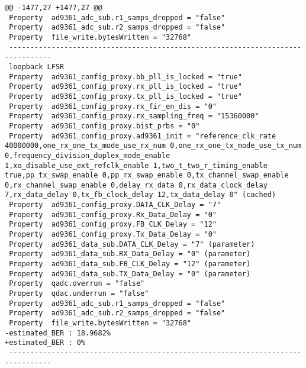\begin{lstlisting}
@@ -1477,27 +1477,27 @@
 Property  ad9361_adc_sub.r1_samps_dropped = "false"
 Property  ad9361_adc_sub.r2_samps_dropped = "false"
 Property  file_write.bytesWritten = "32768"
 --------------------------------------------------------------------------------
 loopback LFSR
 Property  ad9361_config_proxy.bb_pll_is_locked = "true"
 Property  ad9361_config_proxy.rx_pll_is_locked = "true"
 Property  ad9361_config_proxy.tx_pll_is_locked = "true"
 Property  ad9361_config_proxy.rx_fir_en_dis = "0"
 Property  ad9361_config_proxy.rx_sampling_freq = "15360000"
 Property  ad9361_config_proxy.bist_prbs = "0"
 Property  ad9361_config_proxy.ad9361_init = "reference_clk_rate 40000000,one_rx_one_tx_mode_use_rx_num 0,one_rx_one_tx_mode_use_tx_num 0,frequency_division_duplex_mode_enable 1,xo_disable_use_ext_refclk_enable 1,two_t_two_r_timing_enable true,pp_tx_swap_enable 0,pp_rx_swap_enable 0,tx_channel_swap_enable 0,rx_channel_swap_enable 0,delay_rx_data 0,rx_data_clock_delay 7,rx_data_delay 0,tx_fb_clock_delay 12,tx_data_delay 0" (cached)
 Property  ad9361_config_proxy.DATA_CLK_Delay = "7"
 Property  ad9361_config_proxy.Rx_Data_Delay = "0"
 Property  ad9361_config_proxy.FB_CLK_Delay = "12"
 Property  ad9361_config_proxy.Tx_Data_Delay = "0"
 Property  ad9361_data_sub.DATA_CLK_Delay = "7" (parameter)
 Property  ad9361_data_sub.RX_Data_Delay = "0" (parameter)
 Property  ad9361_data_sub.FB_CLK_Delay = "12" (parameter)
 Property  ad9361_data_sub.TX_Data_Delay = "0" (parameter)
 Property  qadc.overrun = "false"
 Property  qdac.underrun = "false"
 Property  ad9361_adc_sub.r1_samps_dropped = "false"
 Property  ad9361_adc_sub.r2_samps_dropped = "false"
 Property  file_write.bytesWritten = "32768"
-estimated_BER : 18.9682%
+estimated_BER : 0%
 --------------------------------------------------------------------------------
\end{lstlisting}


